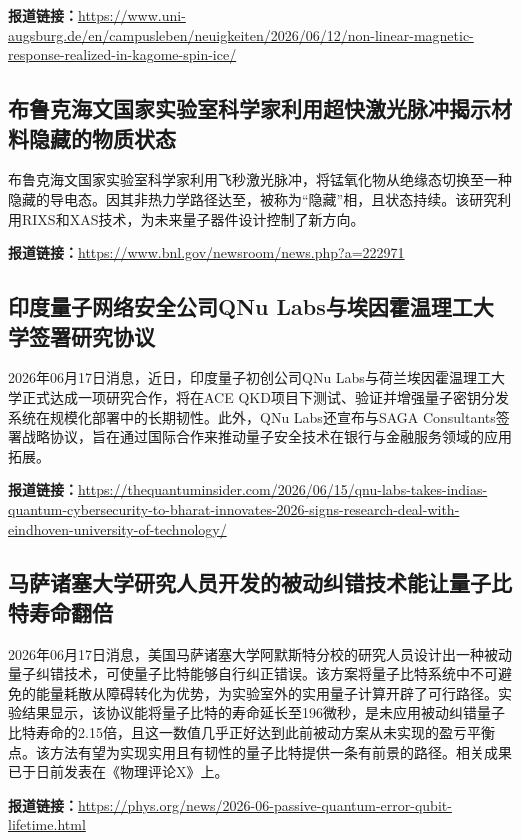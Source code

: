 \documentclass[12pt,a4paper]{ctexart}
\begin{document}
\noindent\textbf{报道链接：}\url{https://www.uni-augsburg.de/en/campusleben/neuigkeiten/2026/06/12/non-linear-magnetic-response-realized-in-kagome-spin-ice/}

\subsection{ 布鲁克海文国家实验室科学家利用超快激光脉冲揭示材料隐藏的物质状态 }

布鲁克海文国家实验室科学家利用飞秒激光脉冲，将锰氧化物从绝缘态切换至一种隐藏的导电态。因其非热力学路径达至，被称为“隐藏”相，且状态持续。该研究利用RIXS和XAS技术，为未来量子器件设计控制了新方向。

\noindent\textbf{报道链接：}\url{https://www.bnl.gov/newsroom/news.php?a=222971}

\subsection{ 印度量子网络安全公司QNu Labs与埃因霍温理工大学签署研究协议 }

2026年06月17日消息，近日，印度量子初创公司QNu Labs与荷兰埃因霍温理工大学正式达成一项研究合作，将在ACE QKD项目下测试、验证并增强量子密钥分发系统在规模化部署中的长期韧性。此外，QNu Labs还宣布与SAGA Consultants签署战略协议，旨在通过国际合作来推动量子安全技术在银行与金融服务领域的应用拓展。

\noindent\textbf{报道链接：}\url{https://thequantuminsider.com/2026/06/15/qnu-labs-takes-indias-quantum-cybersecurity-to-bharat-innovates-2026-signs-research-deal-with-eindhoven-university-of-technology/}

\subsection{ 马萨诸塞大学研究人员开发的被动纠错技术能让量子比特寿命翻倍 }

2026年06月17日消息，美国马萨诸塞大学阿默斯特分校的研究人员设计出一种被动量子纠错技术，可使量子比特能够自行纠正错误。该方案将量子比特系统中不可避免的能量耗散从障碍转化为优势，为实验室外的实用量子计算开辟了可行路径。实验结果显示，该协议能将量子比特的寿命延长至196微秒，是未应用被动纠错量子比特寿命的2.15倍，且这一数值几乎正好达到此前被动方案从未实现的盈亏平衡点。该方法有望为实现实用且有韧性的量子比特提供一条有前景的路径。相关成果已于日前发表在《物理评论X》上。

\noindent\textbf{报道链接：}\url{https://phys.org/news/2026-06-passive-quantum-error-qubit-lifetime.html}
\end{document}
